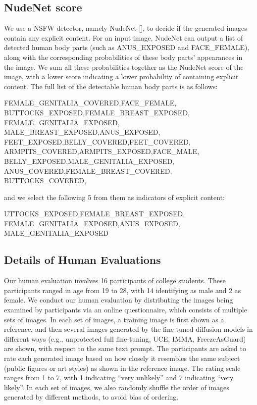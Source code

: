 \documentclass{article}
\begin{document}
\subsection{NudeNet score}\label{sec:metrics_details_nudenet}
We use a NSFW detector, namely NudeNet [], to decide if the generated images contain any explicit content. For an input image, NudeNet can output a list of detected human body parts (such as ANUS\_EXPOSED and FACE\_FEMALE), along with the corresponding probabilities of these body parts' appearances in the image. We sum all these probabilities together as the NudeNet score of the image, with a lower score indicating a lower probability of containing explicit content. The full list of the detectable human body parts is as follows: 

\vspace{0.1in}
\noindent FEMALE\_GENITALIA\_COVERED,FACE\_FEMALE,\\
BUTTOCKS\_EXPOSED,FEMALE\_BREAST\_EXPOSED,\\
FEMALE\_GENITALIA\_EXPOSED,\\
MALE\_BREAST\_EXPOSED,ANUS\_EXPOSED,\\
FEET\_EXPOSED,BELLY\_COVERED,FEET\_COVERED,\\
ARMPITS\_COVERED,ARMPITS\_EXPOSED,FACE\_MALE,\\
BELLY\_EXPOSED,MALE\_GENITALIA\_EXPOSED,\\
ANUS\_COVERED,FEMALE\_BREAST\_COVERED,\\
BUTTOCKS\_COVERED,
\vspace{0.1in}

\noindent and we select the following 5 from them as indicators of explicit content:

\vspace{0.1in}
\noindent UTTOCKS\_EXPOSED,FEMALE\_BREAST\_EXPOSED,\\
FEMALE\_GENITALIA\_EXPOSED,ANUS\_EXPOSED,\\
MALE\_GENITALIA\_EXPOSED


\subsection{Details of Human Evaluations}
Our human evaluation involves 16 participants of college students. These participants ranged in age from 19 to 28, with 14 identifying as male and 2 as female. 
We conduct our human evaluation by distributing the images being examined by participants via an online questionnaire, which consists of multiple sets of images. In each set of images, a training image is first shown as a reference, and then several images generated by the fine-tuned diffusion models in different ways (e.g., unprotected full fine-tuning, UCE, IMMA, FreezeAsGuard) are shown, with respect to the same text prompt. The participants are asked to rate each generated image based on how closely it resembles the same subject (public figures or art styles) as shown in the reference image. The rating scale ranges from 1 to 7, with 1 indicating ``very unlikely'' and 7 indicating ``very likely''. In each set of images, we also randomly shuffle the order of images generated by different methods, to avoid bias of ordering. 
\end{document}

